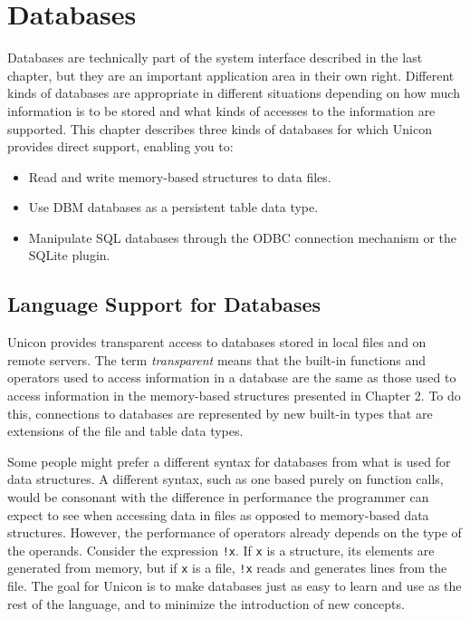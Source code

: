 \chapter{Databases}

Databases are technically part of the system interface
described in the last chapter, but they are an important application
area in their own right. Different kinds of databases are
appropriate in different situations depending on how much information is to
be stored and what kinds of accesses to the information are supported.
This chapter describes three kinds of databases for which Unicon
provides direct support, enabling you to:

\begin{itemize}
\item Read and write memory-based structures to data files.
\item Use DBM databases as a persistent table data type.
\item Manipulate SQL databases through the ODBC connection mechanism
  or the SQLite plugin.
\end{itemize}

\section{Language Support for Databases}

Unicon provides transparent access to databases stored in local files
and on remote servers. The term
{\em transparent\/} means that the built-in
functions and operators used to access information in a database are
the same as those used to access information in the memory-based
structures presented in Chapter 2. To do this, connections to databases
are represented by new built-in types that are extensions of the file
and table data types.

Some people might prefer a different syntax for databases from what is
used for data structures. A different syntax, such as one based purely
on function calls, would be consonant with the difference in
performance the programmer can expect to see when accessing data in
files as opposed to memory-based data structures. However, the
performance of operators already depends on the type of the operands.
Consider the expression \texttt{!x}. If \texttt{x} is a structure, its
elements are generated from memory, but if \texttt{x} is a file,
\texttt{!x} reads and generates lines from the file. The goal for
Unicon is to make databases just as easy to learn and use as the rest
of the language, and to minimize the introduction of new concepts.

